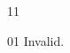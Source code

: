 \documentclass[paper=A4]{ropas-poster}
\begin{document}
\begin{postergrid}{1}{1}
\begin{posterblock}{0}{1}
Invalid.
\end{posterblock}
\end{postergrid}
\end{document}
